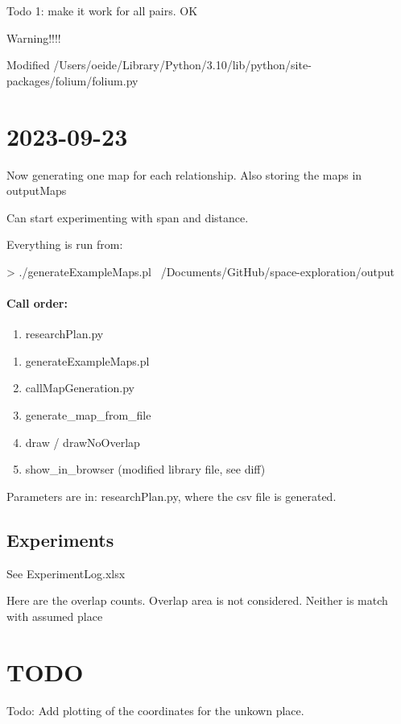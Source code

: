 \documentclass[12pt]{book}
\begin{document}
Todo 1: make it work for all pairs. OK

Warning!!!!

Modified /Users/oeide/Library/Python/3.10/lib/python/site-packages/folium/folium.py

\section{2023-09-23}

Now generating one map for each relationship. Also storing the maps in outputMaps

Can start experimenting with span and distance. 

Everything is run from: 

> ./generateExampleMaps.pl ~/Documents/GitHub/space-exploration/output


\paragraph{Call order:}


\begin{enumerate}
\item researchPlan.py
\end{enumerate}

\begin{enumerate}
\item generateExampleMaps.pl
\item callMapGeneration.py
\item generate\_map\_from\_file
\item draw / drawNoOverlap
\item show\_in\_browser (modified library file, see diff)
\end{enumerate}

Parameters are in: researchPlan.py, where the csv file is generated.

\subsection{Experiments}

See ExperimentLog.xlsx

Here are the overlap counts. Overlap area is not considered. Neither is match with assumed place

\section{TODO}

Todo: Add plotting of the coordinates for the unkown place.



\end{document}
